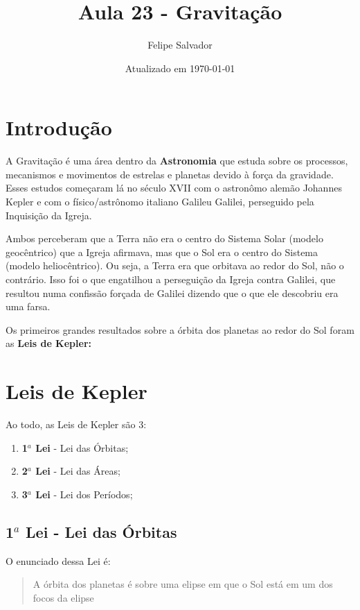 \documentclass[12pt]{extarticle}
\title{Aula 23 - Gravitação}
\author{Felipe Salvador}
\date{Atualizado em \today}
\newcommand{\<}{\langle}
\renewcommand{\>}{\rangle}
\theoremstyle{definition}
\begin{document}
\maketitle

\section{Introdução}
A Gravitação é uma área dentro da \textbf{Astronomia} que estuda sobre os processos, mecanismos e movimentos de estrelas e planetas devido à força da gravidade. Esses estudos começaram lá no século XVII com o astronômo alemão Johannes Kepler e com o físico/astrônomo italiano Galileu Galilei, perseguido pela Inquisição da Igreja.

Ambos perceberam que a Terra não era o centro do Sistema Solar (modelo geocêntrico) que a Igreja afirmava, mas que o Sol era o centro do Sistema (modelo heliocêntrico). Ou seja, a Terra era que orbitava ao redor do Sol, não o contrário. Isso foi o que engatilhou a perseguição da Igreja contra Galilei, que resultou numa confissão forçada de Galilei dizendo que o que ele descobriu era uma farsa.

Os primeiros grandes resultados sobre a órbita dos planetas ao redor do Sol foram as \textbf{Leis de Kepler:}

\section{Leis de Kepler}
Ao todo, as Leis de Kepler são 3:
\begin{enumerate}
    \item \textbf{1$^a$ Lei} - Lei das Órbitas;
    \item \textbf{2$^a$ Lei} - Lei das Áreas;
    \item \textbf{3$^a$ Lei} - Lei dos Períodos;
\end{enumerate}

\subsection{1$^a$ Lei - Lei das Órbitas}
O enunciado dessa Lei é:
\begin{quote}
    A órbita dos planetas é sobre uma elipse em que o Sol está em um dos focos da elipse
\end{quote}
\end{document}
